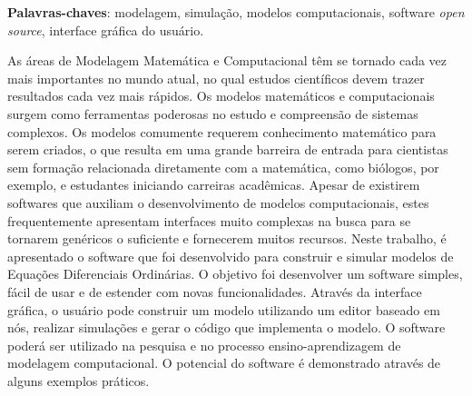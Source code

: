 \begin{resumo}
	
	
	\vspace{\onelineskip}
	
	\noindent
	\textbf{Palavras-chaves}: modelagem, simulação, modelos computacionais, software \textit{open source}, interface gráfica do usuário.
	
	As áreas de Modelagem Matemática e Computacional têm se tornado cada vez mais importantes no mundo atual, no qual estudos científicos devem trazer resultados cada vez mais rápidos. Os modelos matemáticos e computacionais surgem como ferramentas poderosas no estudo e compreensão de sistemas complexos. Os modelos comumente requerem conhecimento matemático para serem criados, o que resulta em uma grande barreira de entrada para cientistas sem formação relacionada diretamente com a matemática, como biólogos, por exemplo, e estudantes iniciando carreiras acadêmicas. Apesar de existirem softwares que auxiliam o desenvolvimento de modelos computacionais, estes frequentemente apresentam interfaces muito complexas na busca para se tornarem genéricos o suficiente e fornecerem muitos recursos. Neste trabalho, é apresentado o software que foi desenvolvido para construir e simular modelos de Equações Diferenciais Ordinárias. O objetivo foi desenvolver um software simples, fácil de usar e de estender com novas funcionalidades. Através da interface gráfica, o usuário pode construir um modelo utilizando um editor baseado em nós, realizar simulações e gerar o código que implementa o modelo. O software poderá ser utilizado na pesquisa e no processo ensino-aprendizagem de modelagem computacional. O potencial do software é demonstrado através de alguns exemplos práticos.
\end{resumo}

